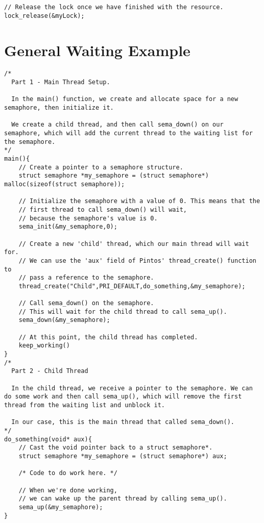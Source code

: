 \documentclass[11pt, letterpaper]{article}
\begin{document}
\begin{appendices}
\begin{lstlisting}[frame=single,basicstyle=\footnotesize]
// Release the lock once we have finished with the resource.
lock_release(&myLock);
\end{lstlisting}

\pagebreak

\section{General Waiting Example}
\begin{lstlisting}[frame=single,basicstyle=\footnotesize]
/*
  Part 1 - Main Thread Setup.

  In the main() function, we create and allocate space for a new semaphore, then initialize it. 

  We create a child thread, and then call sema_down() on our semaphore, which will add the current thread to the waiting list for the semaphore.
*/
main(){
	// Create a pointer to a semaphore structure.
	struct semaphore *my_semaphore = (struct semaphore*) malloc(sizeof(struct semaphore));

	// Initialize the semaphore with a value of 0. This means that the 
	// first thread to call sema_down() will wait, 
	// because the semaphore's value is 0.
	sema_init(&my_semaphore,0);

	// Create a new 'child' thread, which our main thread will wait for.
	// We can use the 'aux' field of Pintos' thread_create() function to 
	// pass a reference to the semaphore.
	thread_create("Child",PRI_DEFAULT,do_something,&my_semaphore);
	
	// Call sema_down() on the semaphore. 
	// This will wait for the child thread to call sema_up().
	sema_down(&my_semaphore);
	
	// At this point, the child thread has completed.
	keep_working()
}
/*
  Part 2 - Child Thread

  In the child thread, we receive a pointer to the semaphore. We can do some work and then call sema_up(), which will remove the first thread from the waiting list and unblock it.

  In our case, this is the main thread that called sema_down().
*/
do_something(void* aux){
	// Cast the void pointer back to a struct semaphore*.
	struct semaphore *my_semaphore = (struct semaphore*) aux;
	
	/* Code to do work here. */
	
	// When we're done working, 
	// we can wake up the parent thread by calling sema_up().
	sema_up(&my_semaphore);
}
\end{lstlisting}

\end{appendices}
\end{document}
